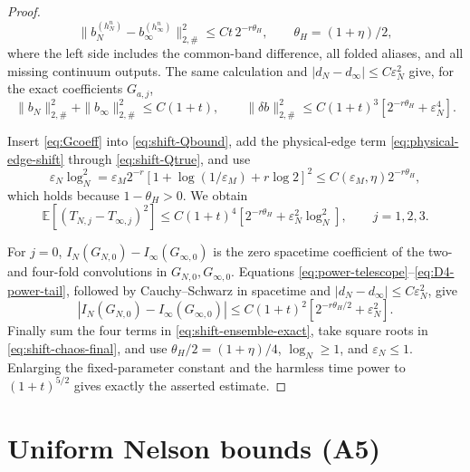 \documentclass[11pt,a4paper]{article}
\theoremstyle{plain}
\theoremstyle{definition}
\newcommand{\E}{\mathbb{E}}
\newcommand{\eps}{\varepsilon}
\begin{document}
\begin{proof}
\begin{equation}
 \|b_N^{(h_N^n)}-b_\infty^{(h_\infty^n)}\|_{2,\#}^2
 \le Ct\,2^{-r\theta_H},\qquad \theta_H=(1+\eta)/2,                \label{eq:power-coeff-diff}
\end{equation}
where the left side includes the common-band difference, all folded aliases, and
all missing continuum outputs.  The same calculation and
$|d_N-d_\infty|\le C\eps_N^2$ give, for the exact coefficients $G_{a,j}$,
\begin{equation}
 \|b_N\|_{2,\#}^2+\|b_\infty\|_{2,\#}^2\le C(1+t),\qquad
 \|\delta b\|_{2,\#}^2\le C(1+t)^3
       [2^{-r\theta_H}+\eps_N^4].                                  \label{eq:Gcoeff}
\end{equation}

Insert \eqref{eq:Gcoeff} into \eqref{eq:shift-Qbound}, add the physical-edge
term \eqref{eq:physical-edge-shift} through \eqref{eq:shift-Qtrue}, and use
\begin{equation}
 \eps_N\log_N^2=\eps_M2^{-r}
 [1+\log(1/\eps_M)+r\log2]^2
 \le C(\eps_M,\eta)2^{-r\theta_H},                                  \label{eq:edge-absorb}
\end{equation}
which holds because $1-\theta_H>0$.  We obtain
\begin{equation}
 \E[(T_{N,j}-T_{\infty,j})^2]
 \le C(1+t)^4[2^{-r\theta_H}+\eps_N^2\log_N^2],
 \qquad j=1,2,3.                                                     \label{eq:shift-chaos-final}
\end{equation}

For $j=0$, $I_N(G_{N,0})-I_\infty(G_{\infty,0})$ is the zero spacetime
coefficient of the two- and four-fold convolutions in $G_{N,0},G_{\infty,0}$.
Equations \eqref{eq:power-telescope}--\eqref{eq:D4-power-tail}, followed by
Cauchy--Schwarz in spacetime and $|d_N-d_\infty|\le C\eps_N^2$, give
\begin{equation}
 |I_N(G_{N,0})-I_\infty(G_{\infty,0})|
 \le C(1+t)^2[2^{-r\theta_H/2}+\eps_N^2].                            \label{eq:shift-zero}
\end{equation}
Finally sum the four terms in \eqref{eq:shift-ensemble-exact}, take square roots in
\eqref{eq:shift-chaos-final}, and use
$\theta_H/2=(1+\eta)/4$, $\log_N\ge1$, and $\eps_N\le1$.  Enlarging the
fixed-parameter constant and the harmless time power to $(1+t)^{5/2}$ gives exactly
the asserted estimate.
\end{proof}

\section{Uniform Nelson bounds (A5)}\label{sec:A5}
\end{document}
